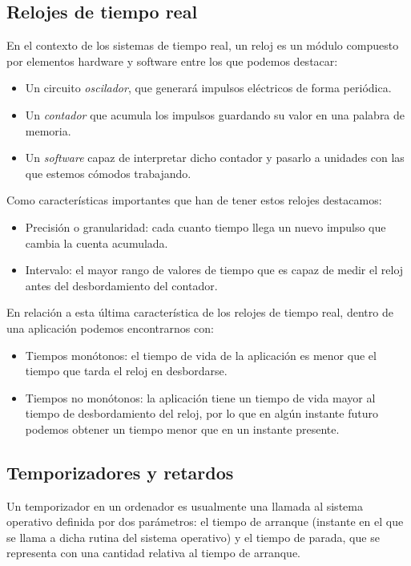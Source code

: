 \subsection{Relojes de tiempo real}
En el contexto de los sistemas de tiempo real, un reloj es un módulo compuesto por elementos hardware y software entre los que podemos destacar:
\begin{itemize}
    \item Un circuito \textit{oscilador}, que generará impulsos eléctricos de forma periódica.
    \item Un \textit{contador} que acumula los impulsos guardando su valor en una palabra de memoria.
    \item Un \textit{software} capaz de interpretar dicho contador y pasarlo a unidades con las que estemos cómodos trabajando.
\end{itemize}

Como características importantes que han de tener estos relojes destacamos:
\begin{itemize}
    \item Precisión o granularidad: cada cuanto tiempo llega un nuevo impulso que cambia la cuenta acumulada. 
    \item Intervalo: el mayor rango de valores de tiempo que es capaz de medir el reloj antes del desbordamiento del contador.
\end{itemize}

En relación a esta última característica de los relojes de tiempo real, dentro de una aplicación podemos encontrarnos con:
\begin{itemize}
    \item Tiempos monótonos: el tiempo de vida de la aplicación es menor que el tiempo que tarda el reloj en desbordarse.
    \item Tiempos no monótonos: la aplicación tiene un tiempo de vida mayor al tiempo de desbordamiento del reloj, por lo que en algún instante futuro podemos obtener un tiempo menor que en un instante presente.
\end{itemize}

\subsection{Temporizadores y retardos}
Un temporizador en un ordenador es usualmente una llamada al sistema operativo definida por dos parámetros: el tiempo de arranque (instante en el que se llama a dicha rutina del sistema operativo) y el tiempo de parada, que se representa con una cantidad relativa al tiempo de arranque.\\

